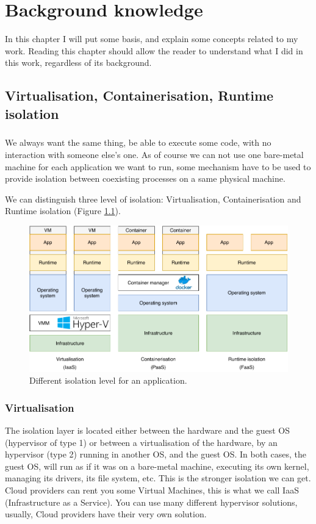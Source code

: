 \chapter{Background knowledge}

In this chapter I will put some basis, and explain some concepts related to my work.  Reading this chapter should allow the reader to understand what I did in this work, regardless of its background.

\section{Virtualisation, Containerisation, Runtime isolation}
\paragraph{}We always want the same thing, be able to execute some code, with no interaction with someone else's one.  As of course we can not use one bare-metal machine for each application we want to run, some mechanism have to be used to provide isolation between coexisting processes on a same physical machine.

We can distinguish three level of isolation: Virtualisation, Containerisation and Runtime isolation (Figure \ref{fig:virt-cont-runt}).
\begin{figure}
  \begin{center}
    \includegraphics[width=\linewidth]{images/Virt-Cont-Runt.pdf}
    \caption{Different isolation level for an application.}
    \label{fig:virt-cont-runt}
  \end{center}
\end{figure}
\subsection{Virtualisation}
The isolation layer is located either between the hardware and the guest OS (hypervisor of type 1) or between a virtualisation of the hardware, by an hypervisor (type 2) running in another OS, and the guest OS.  In both cases, the guest OS, will run as if it was on a bare-metal machine, executing its own kernel, managing its drivers, its file system, etc.  This is the stronger isolation we can get.  Cloud providers can rent you some Virtual Machines, this is what we call IaaS (Infrastructure as a Service).  You can use many different hypervisor solutions, usually, Cloud providers have their very own solution.
